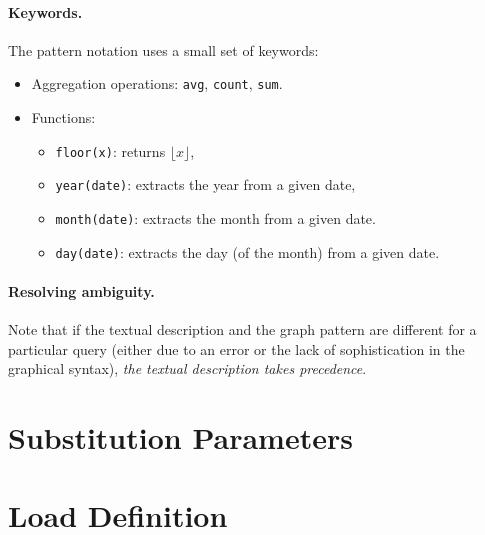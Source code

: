 \paragraph{Keywords.} The pattern notation uses a small set of keywords:

\begin{itemize}
	\item Aggregation operations:
	\lstinline{avg},
	\lstinline{count}, 
	\lstinline{sum}.
	\item Functions:
	\begin{itemize}
		\item \lstinline{floor(x)}: returns $\lfloor x \rfloor$,
		\item \lstinline{year(date)}: extracts the year from a given date,
		\item \lstinline{month(date)}: extracts the month from a given date.
		\item \lstinline{day(date)}: extracts the day (of the month) from a given date.
	\end{itemize}
\end{itemize}

\paragraph{Resolving ambiguity.} Note that if the textual description and the graph pattern are different for a particular query (either due to an error or the lack of sophistication in the graphical syntax), \emph{the textual description takes precedence}.


\section{Substitution Parameters}




\section{Load Definition}


